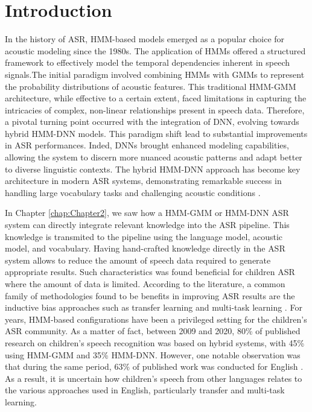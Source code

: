 \label{chap:Chapter3}
\cleardoublepage
\section{Introduction}

In the history of \ac{ASR}, HMM-based models emerged as a popular choice for acoustic modeling since the 1980s. The application of \acp{HMM} offered a structured framework to effectively model the temporal dependencies inherent in speech signals.The initial paradigm involved combining \acp{HMM} with \acp{GMM} to represent the probability distributions of acoustic features. This traditional \ac{HMM-GMM} architecture, while effective to a certain extent, faced limitations in capturing the intricacies of complex, non-linear relationships present in speech data. Therefore, a pivotal turning point occurred with the integration of \ac{DNN}, evolving towards hybrid \ac{HMM-DNN} models. This paradigm shift lead to substantial improvements in \ac{ASR} performances. Inded, \acp{DNN} brought enhanced modeling capabilities, allowing the system to discern more nuanced acoustic patterns and adapt better to diverse linguistic contexts. The hybrid \ac{HMM-DNN} approach has become key architecture in modern \ac{ASR} systems, demonstrating remarkable success in handling large vocabulary tasks and challenging acoustic conditions \cite{hmm-dnn}. 

In Chapter \ref{chap:Chapter2}, we saw how a \ac{HMM-GMM} or \ac{HMM-DNN} \ac{ASR} system can directly integrate relevant knowledge into the \ac{ASR} pipeline. This knowledge is transmited to the pipeline using the language model, acoustic model, and vocabulary. Having hand-crafted knowledge directly in the \ac{ASR} system allows to reduce the amount of speech data required to generate appropriate results. Such characteristics was found beneficial for children \ac{ASR} where the amount of data is limited. According to the literature, a common family of methodologies  found to be benefits in improving \ac{ASR} results are the inductive bias approaches such as transfer learning and multi-task learning \cite{TransferLF}. For years, HMM-based configurations have been a privileged setting for the children's \ac{ASR} community. As a matter of fact, between 2009 and 2020, 80\% of published research on children's speech recognition was based on hybrid systems, with 45\% using \ac{HMM-GMM} and 35\% \ac{HMM-DNN}. However, one notable observation was that during the same period, 63\% of published work was conducted for English \cite{big_review_childASR}. As a result, it is uncertain how children's speech from other languages relates to the various approaches used in English, particularly transfer and multi-task learning.

